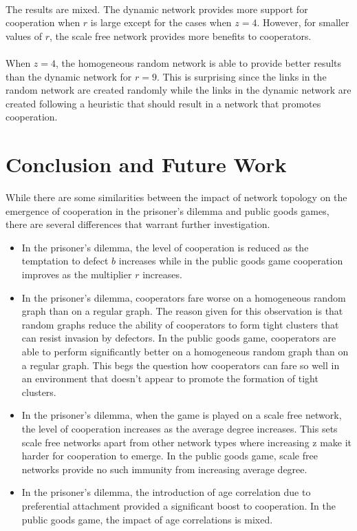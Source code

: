 \documentclass{article}
\begin{document}
	\paragraph{}The results are mixed.  The dynamic network provides more support for cooperation when $r$ is large except for the cases when $z=4$.  However, for smaller values of $r$, the scale free network provides more benefits to cooperators.
	\paragraph{}When $z=4$, the homogeneous random network is able to provide better results than the dynamic network for $r=9$.  This is surprising since the links in the random network are created randomly while the links in the dynamic network are created following a heuristic that should result in a network that promotes cooperation.

	\section{Conclusion and Future Work}
	While there are some similarities between the impact of network topology on the emergence of cooperation in the prisoner's dilemma and public goods games, there are several differences that warrant further investigation.

	\begin{itemize}
		\item In the prisoner's dilemma, the level of cooperation is reduced as the temptation to defect $b$ increases while in the public goods game cooperation improves as the multiplier $r$ increases.
		\item In the prisoner's dilemma, cooperators fare worse on a homogeneous random graph than on a regular graph.  The reason given for this observation is that random graphs reduce the ability of cooperators to form tight clusters that can resist invasion by defectors.  In the public goods game, cooperators are able to perform significantly better on a homogeneous random graph than on a regular graph.  This begs the question how cooperators can fare so well in an environment that doesn't appear to promote the formation of tight clusters.
		\item In the prisoner's dilemma, when the game is played on a scale free network, the level of cooperation increases as the average degree increases.  This sets scale free networks apart from other network types where increasing z make it harder for cooperation to emerge.  In the public goods game, scale free networks provide no such immunity from increasing average degree.
		\item In the prisoner's dilemma, the introduction of age correlation due to preferential attachment provided a significant boost to cooperation.  In the public goods game, the impact of age correlations is mixed.
	\end{itemize}
\end{document}

